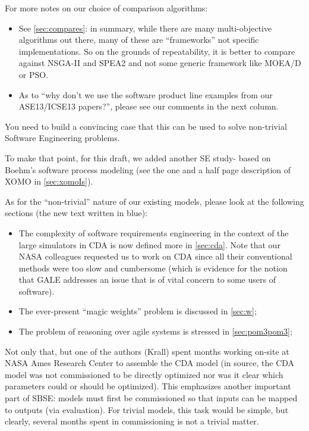 \documentclass[10pt,journal,compsoc]{IEEEtran}
\newcommand{\bi}{\begin{itemize}}
\newcommand{\ei}{\end{itemize}}
\newcommand{\tion}[1]{\textsection\ref{sec:#1}}
\newenvironment{changed}{\par\color{MyDarkBlue}}{\par}
\begin{document}
\begin{changed}


For more notes on our choice of comparison algorithms:
\bi
\item
See \tion{compares}: in summary, while there are many multi-objective algorithms out
there, many of these are ``frameworks'' not specific implementations.
So on the grounds of repeatability, it is better to compare against
NSGA-II and SPEA2 and not some generic framework like MOEA/D or PSO.
\item As to ``why don't we use the software product line examples from
our ASE13/ICSE13 papers?'', please see our comments in the next column.
\ei


\end{changed}

You need to build a convincing case that this can be
used to solve non-trivial Software Engineering
problems.  
\begin{changed}
To make that point, for this draft,
we added another SE study- based on Boehm's
software process modeling (see the one and a half page description
of XOMO in \tion{xomoIs}).


As for the ``non-trivial'' nature of our existing models,
please look at the following sections (the new text written in blue):
\bi
\item
The complexity of software requirements engineering in the context
of the large simulators in CDA is now defined more in \tion{cda}.
Note that our NASA colleagues requested us to work on CDA
since all their conventional methods were too slow and cumbersome (which is
evidence for the notion that GALE addresses an issue that is of
vital concern to some users of software).
\item
The ever-present ``magic weights'' problem is discussed in \tion{w};
\item
The problem of reasoning over agile systems is stressed in \tion{pom3pom3};
\ei

Not only that, but one of the authors (Krall)
spent months working on-site at NASA Ames Research Center to assemble the CDA model (in source,
the CDA model was not commissioned to be directly optimized nor was it clear which parameters could
or should be optimized).  This emphasizes another important part of SBSE: models must first be commissioned
so that inputs can be mapped to outputs (via evaluation).  For trivial models, this task would be simple, but
clearly, several months spent in commissioning is not a trivial matter.
\end{changed}
\end{document}
